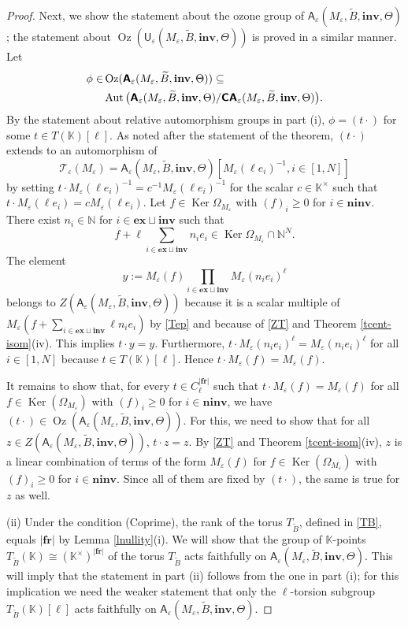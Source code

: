 \documentclass[11pt]{amsart}
\theoremstyle{plain}
\newcommand{\nn}{\hfill\nonumber}
\newcommand \thref[1]{Theorem \ref{t#1}}
\newcommand \leref[1]{Lemma \ref{l#1}}
\def \KK {{\mathbb C}}
\def \KK {{\mathbb K}}
\def \Nset {{\mathbb N}}
\def \A {{\boldsymbol{\mathsf A}}}
\def \C {{\boldsymbol{\mathsf C}}}
\def \U {{\boldsymbol{\mathsf U}}}
\def \B  {{\widetilde{B}}}
\newcommand \ex {{\mathbf{ex}}}
\newcommand \fr {{\mathbf{fr}}}
\newcommand \inv {{\mathbf{inv}}}
\newcommand \ninv {{\mathbf{ninv}}}
\def \TT {{\mathcal{T}}}
\def \Om {\Omega}
\def \ep {\varepsilon}
\DeclareMathOperator \Aut { {\mathrm{Aut}} }
\DeclareMathOperator \Oz { {\mathrm{Oz}}}
\DeclareMathOperator \Ker { {\mathrm{Ker}} }
\begin{document}
\begin{proof}
Next, we show the statement about the ozone group of  
$\A_\ep(M_\ep, \B, \inv, \Theta)$; the statement about 
$\Oz(\U_\ep(M_\ep, \B, \inv, \Theta))$ is proved in a similar manner. Let 
\begin{align}
\nn
\phi \in &\Oz(\A_\ep(M_\ep, \B, \inv, \Theta)) \subseteq 
\\
&\Aut\big(\A_\ep(M_\ep, \B, \inv, \Theta)/\C\A_\ep(M_\ep, \B, \inv, \Theta) \big).
\label{in}
\end{align}
By the statement about relative automorphism groups in part (i), $\phi = (t \cdot)$ for some $t \in T(\KK)[\ell]$. 
As noted after the statement of the theorem, $(t \cdot)$ extends to an automorphism of 
\[
\TT_\ep(M_\ep) = \A_\ep(M_\ep, \B, \inv, \Theta)
[M_\ep(\ell e_i)^{-1}, i \in [1,N]]
\]
by setting 
$t \cdot M_\ep(\ell e_i)^{-1} = c^{-1} M_\ep(\ell e_i)^{-1}$
for the scalar $c \in \KK^\times$ such that 
$t \cdot M_\ep(\ell e_i) = c M_\ep(\ell e_i)$. 
Let $f \in \Ker \Om_{M_\ep}$ with $(f)_i \geq 0$ for
$i \in \ninv$.  There exist
$n_i \in \Nset$ for $i \in \ex \sqcup \inv$ such that
\[
f + \ell \sum_{i \in \ex \sqcup \inv} n_i e_i \in 
\Ker \Om_{M_\ep} \cap \Nset^N.
\]
The element
\[
y:=M_\ep(f) \prod_{i \in \ex \sqcup \inv} M_\ep(n_i e_i)^{\ell} 
\]
belongs to $Z(\A_\ep(M_\ep, \B, \inv, \Theta))$ because it is a scalar multiple of $M_\ep(f + \sum_{i \in \ex \sqcup \inv} \ell n_i e_i)$ by \eqref{Tep} and because of \eqref{ZT} and \thref{cent-isom}(iv). 
This implies $t \cdot y = y$. 
Furthermore, $t \cdot M_\ep(n_i e_i)^{\ell} = M_\ep(n_i e_i)^{\ell}$ for all $i \in [1,N]$ because $t \in T(\KK)[\ell]$. Hence $t \cdot M_\ep(f) = M_\ep(f)$. 

It remains to show that, for every 
$t \in C_\ell^{|\fr|}$ such that $t \cdot M_\ep(f) = M_\ep(f)$ for all $f \in \Ker (\Om_{M_\ep})$ with $(f)_i \geq 0$ for $i \in \ninv$, we have $(t \cdot) \in \Oz(\A_\ep(M_\ep, \B, \inv, \Theta))$. For this, we need to show that for all $z \in Z(\A_\ep(M_\ep, \B, \inv, \Theta))$, $t \cdot z = z$. By \eqref{ZT} and \thref{cent-isom}(iv), $z$ is a linear combination of terms of the form $M_\ep(f)$ for $f \in \Ker (\Om_{M_\ep})$ with $(f)_i \geq 0$ for $i \in \ninv$. Since all of them are fixed by $(t \cdot)$, the same is true for $z$ as well.

(ii) Under the condition (Coprime), the rank of the torus $T_{\B}$, defined in \eqref{TB}, equals $|\fr|$ by \leref{nullity}(i). We will show that the group of $\KK$-points $T_{\B}(\KK) \cong (\KK^\times)^{|\fr|}$ of the torus $T_{\B}$ acts faithfully on $\A_\ep(M_\ep, \B, \inv, \Theta)$. This will imply that the statement in part (ii) follows from the one in part (i); for this implication we need the weaker statement that only the $\ell$-torsion subgroup $T_{\B}(\KK)[\ell]$ acts 
faithfully on $\A_\ep(M_\ep, \B, \inv, \Theta)$.


\end{proof}
\end{document}
